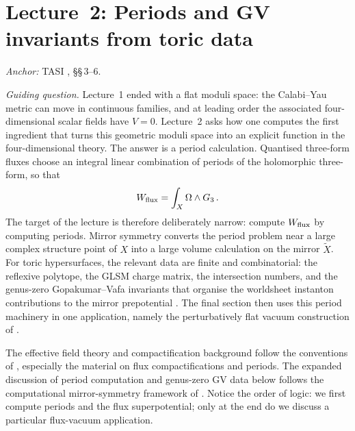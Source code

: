 
\section{Lecture~2: Periods and GV invariants from toric data}\label{sec:L2}

\medskip

\noindent\textit{Anchor:} TASI \cite{McAllister:2025qwq},
\S\S\,3--6.

\medskip



\noindent\textit{Guiding question.}
Lecture~1 ended with a flat moduli space: the Calabi--Yau metric
can move in continuous families, and at leading order the associated
four-dimensional scalar fields have $V=0$.  Lecture~2 asks how one
computes the first ingredient that turns this geometric moduli space
into an explicit function in the four-dimensional theory.  The answer
is a period calculation.  Quantised three-form fluxes choose an
integral linear combination of periods of the holomorphic three-form,
so that
\begin{equation}
    W_{\rm flux}
    =
    \int_X \Omega\wedge G_3\, .
\end{equation}
The target of the lecture is therefore deliberately narrow: compute
$W_{\rm flux}$ by computing periods.  Mirror symmetry converts the
period problem near a large complex structure point of $X$ into a
large volume calculation on the mirror $\widetilde X$.  For toric
hypersurfaces, the relevant data are finite and combinatorial: the
reflexive polytope, the GLSM charge matrix, the intersection numbers, and
the genus-zero Gopakumar--Vafa invariants \cite{Gopakumar:1998ii,Gopakumar:1998jq} that organise the
worldsheet instanton contributions to the mirror prepotential \cite{Candelas:1993dm,Candelas:1994hw}.  The final
section then uses this period machinery in one application, namely the
perturbatively flat vacuum construction of \cite{Demirtas:2019sip}.

The effective field theory and compactification background follow the
conventions of \cite{McAllister:2025qwq}, especially the material on
flux compactifications and periods.  The expanded discussion of period
computation and genus-zero GV data below follows the computational
mirror-symmetry framework of
\cite{Demirtas:2023als,RiosTascon:2023thesis}.  Notice the order of
logic: we first compute periods and the flux superpotential; only at
the end do we discuss a particular flux-vacuum application.

